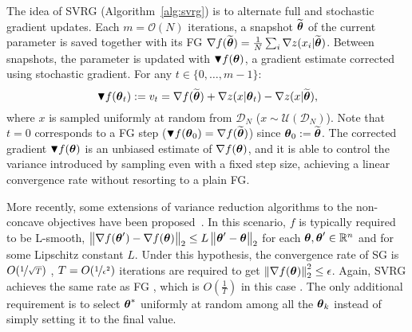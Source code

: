 The idea of \acs{SVRG} (Algorithm~\ref{alg:svrg}) is to alternate full and stochastic gradient updates. 
Each $m = \mathcal{O}(N)$ iterations, a snapshot $\widetilde{\vtheta}$ of the current parameter is saved together with its \acs{FG} $\nabla f(\widetilde{\vtheta}) = \frac{1}{N} \sum_i \nabla z(x_i|\widetilde{\vtheta})$.
Between snapshots, the parameter is updated with $\blacktriangledown f(\vtheta)$, a gradient estimate corrected using stochastic gradient. For any $t \in \{0,\ldots,m-1\}$:
\begin{equation}\label{E:svrg.gradient.correction}
        \blacktriangledown f(\vtheta_{t}) := v_t = \nabla f(\wt{\vtheta}) + \nabla z(x | \vtheta_t) - \nabla z(x | \wt{\vtheta}),
\end{equation} 
where $x$ is sampled uniformly at random from $\mathcal{D}_N$ (\ie $x \sim \mathcal{U}(\mathcal{D}_N)$).
Note that $t=0$ corresponds to a \acs{FG} step (\ie $\blacktriangledown f(\vtheta_0) = \nabla f(\wt{\vtheta})$) since $\vtheta_0 := \wt{\vtheta}$.
The corrected gradient $\blacktriangledown f(\vtheta)$ is an unbiased estimate of $\nabla f(\vtheta)$, and it is able to control the variance introduced by sampling even with a fixed step size, achieving a linear convergence rate without resorting to a plain \acs{FG}.

More recently, some extensions of variance reduction algorithms to the non-concave objectives have been proposed~\citep[\eg][]{allen2016variance,reddi2016stochastic,reddi2016fast}. In this scenario, $f$ is typically required to be L-smooth, \ie $\norm[2]{\nabla f(\vtheta') - \nabla f(\vtheta)} \leq L\norm[2]{\vtheta'-\vtheta}$ for each $\vtheta,\vtheta'\in\realspace^n$ and for some Lipschitz constant $L$. Under this hypothesis, the convergence rate of \acs{SG} is $O(\nicefrac{1}{\sqrt{T}})$ \cite{ghadimi2013stochastic}, \ie $T=O(\nicefrac{1}{\epsilon^2})$ iterations are required to get $\norm[2]{\nabla f(\vtheta)}^2\leq\epsilon$. Again, \acs{SVRG} achieves the same rate as \acs{FG} \cite{reddi2016stochastic}, which is $O(\frac{1}{T})$ in this case \cite{nesterov2013introductory}. The only additional requirement is to select $\vtheta^*$ uniformly at random among all the $\vtheta_k$ instead of simply setting it to the final value.

\vspace{-0.05in}